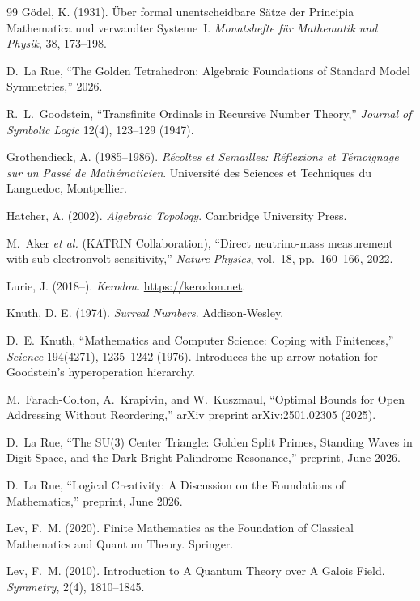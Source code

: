 \documentclass[12pt,oneside]{book}
\begin{document}
\begin{thebibliography}{99}
G\"odel, K. (1931). \"Uber formal unentscheidbare S\"atze der Principia Mathematica und verwandter Systeme~I. \emph{Monatshefte f\"ur Mathematik und Physik}, 38, 173--198.

D.~La Rue,
``The Golden Tetrahedron: Algebraic Foundations of Standard Model Symmetries,''
2026.

R.~L.~Goodstein,
``Transfinite Ordinals in Recursive Number Theory,''
\emph{Journal of Symbolic Logic} 12(4), 123--129 (1947).

Grothendieck, A. (1985--1986). \emph{R\'ecoltes et Semailles: R\'eflexions et T\'emoignage sur un Pass\'e de Math\'ematicien}. Universit\'e des Sciences et Techniques du Languedoc, Montpellier.

Hatcher, A. (2002). \emph{Algebraic Topology}. Cambridge University Press.

M.~Aker \emph{et al.} (KATRIN Collaboration), ``Direct neutrino-mass measurement with sub-electronvolt sensitivity,'' \emph{Nature Physics}, vol.~18, pp.~160--166, 2022.

Lurie, J. (2018--). \emph{Kerodon}. \url{https://kerodon.net}.

Knuth, D. E. (1974). \emph{Surreal Numbers}. Addison-Wesley.

D.~E.~Knuth,
``Mathematics and Computer Science: Coping with Finiteness,''
\emph{Science} 194(4271), 1235--1242 (1976).
Introduces the up-arrow notation for Goodstein's hyperoperation hierarchy.

M.~Farach-Colton, A.~Krapivin, and W.~Kuszmaul,
``Optimal Bounds for Open Addressing Without Reordering,''
arXiv preprint arXiv:2501.02305 (2025).

D.~La Rue, ``The SU(3) Center Triangle: Golden Split Primes, Standing Waves in Digit Space, and the Dark-Bright Palindrome Resonance,'' preprint, June 2026.

D.~La Rue, ``Logical Creativity: A Discussion on the Foundations of Mathematics,'' preprint, June 2026.

Lev, F.~M. (2020).
Finite Mathematics as the Foundation of Classical Mathematics and Quantum Theory.
Springer.

Lev, F.~M. (2010).
Introduction to A Quantum Theory over A Galois Field.
\emph{Symmetry}, 2(4), 1810--1845.


\end{thebibliography}
\end{document}
